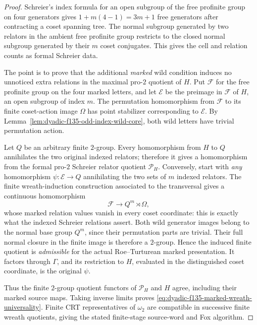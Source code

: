 \documentclass[11pt]{article}
\theoremstyle{definition}
\begin{document}
\begin{proof}
Schreier's index
formula for an open
subgroup of the free
profinite group
on four generators
gives $1+m(4-1)=3m+1$
free generators after
contracting a coset
spanning tree.
The normal subgroup
generated by two
relators in the
ambient free profinite
group restricts to
the closed normal
subgroup generated
by their $m$ coset
conjugates.
This gives the cell
and relation counts
as formal Schreier
data.

The point is to
prove that the
additional \emph{marked}
wild condition induces
no unnoticed extra
relations in the
maximal pro-$2$
quotient of $H$.
Put $\mathcal F$ for the
free profinite group on
the four marked
letters, and let
$\mathcal E$ be the
preimage in $\mathcal F$
of $H$, an open
subgroup of index $m$.
The permutation
homomorphism from
$\mathcal F$ to its
finite coset-action
image $\Omega$ has
point stabilizer
corresponding to
$\mathcal E$.
By
Lemma~\ref{lem:dyadic-f135-odd-index-wild-core},
both wild letters
have trivial
permutation action.

Let $Q$ be an
arbitrary finite
$2$-group.
Every homomorphism
from $H$ to $Q$
annihilates the
two original
indexed relators;
therefore it gives
a homomorphism from
the formal pro-$2$
Schreier relator
quotient $\mathscr P_H$.
Conversely, start
with \emph{any}
homomorphism
$\psi:\mathcal E\to Q$
annihilating the
two sets of $m$
indexed relators.
The finite
wreath-induction
construction
associated to
the transversal
gives a continuous
homomorphism
\begin{equation}\label{eq:dyadic-f135-wreath-extension}
\mathcal F\longrightarrow
Q^m\rtimes\Omega,
\end{equation}
whose marked
relation values
vanish in every
coset coordinate:
this is exactly
what the indexed
Schreier relations
assert.
Both wild
generator images
belong to the
normal base group
$Q^m$, since
their permutation
parts are trivial.
Their full normal
closure in the
finite image is
therefore a
$2$-group.
Hence the induced
finite quotient is
\emph{admissible}
for the actual
Roe--Turturean
marked presentation.
It factors through
$\Gamma$, and its
restriction to $H$,
evaluated in the
distinguished coset
coordinate, is
the original $\psi$.

Thus the finite
$2$-group quotient
functors of
$\mathscr P_H$
and $H$ agree,
including their
marked source
maps.  Taking
inverse limits
proves
\eqref{eq:dyadic-f135-marked-wreath-universality}.
Finite CRT
representatives
of $\omega_2$
are compatible
in successive
finite wreath
quotients, giving
the stated
finite-stage
source-word and
Fox algorithm.
\end{proof}
\end{document}
